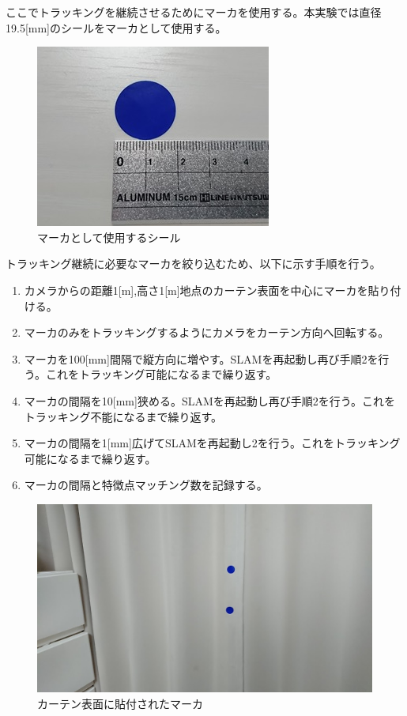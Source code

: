 ここでトラッキングを継続させるためにマーカを使用する。本実験では直径19.5[mm]のシールをマーカとして使用する。

\begin{figure}[h]
        \begin{center}
        \includegraphics[width=0.6\linewidth]{figs/marker01.jpg}
        \caption{マーカとして使用するシール}
        \label{fig:marker01}
        \end{center}
\end{figure}

\newpage

トラッキング継続に必要なマーカを絞り込むため、以下に示す手順を行う。


\begin{enumerate}
   \item カメラからの距離1[m],高さ1[m]地点のカーテン表面を中心にマーカを貼り付ける。
   \item マーカのみをトラッキングするようにカメラをカーテン方向へ回転する。
   \item マーカを100[mm]間隔で縦方向に増やす。SLAMを再起動し再び手順2を行う。これをトラッキング可能になるまで繰り返す。
　 \item マーカの間隔を10[mm]狭める。SLAMを再起動し再び手順2を行う。これをトラッキング不能になるまで繰り返す。
 　\item マーカの間隔を1[mm]広げてSLAMを再起動し2を行う。これをトラッキング可能になるまで繰り返す。
   \item マーカの間隔と特徴点マッチング数を記録する。
\end{enumerate}

\begin{figure}[h]
        \begin{center}
        \includegraphics[width=0.7\linewidth]{figs/marker03.jpg}
        \caption{カーテン表面に貼付されたマーカ}
        \label{fig:marker03}
        \end{center}
\end{figure}

